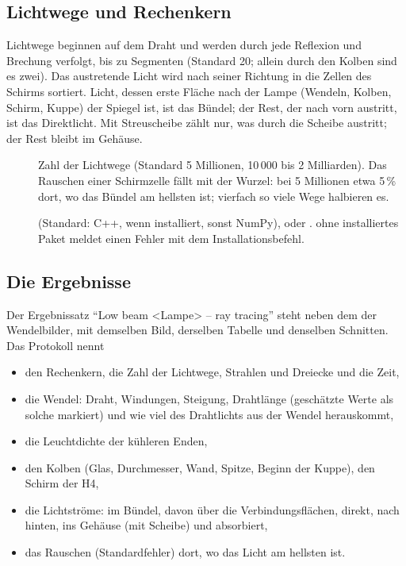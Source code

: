 \subsection{Lichtwege und Rechenkern}

Lichtwege beginnen auf dem Draht und werden durch jede Reflexion und Brechung verfolgt, bis zu
 Segmenten (Standard 20; allein durch den Kolben sind es zwei). Das austretende Licht
wird nach seiner Richtung in die Zellen des Schirms sortiert. Licht, dessen erste Fläche nach der
Lampe (Wendeln, Kolben, Schirm, Kuppe) der Spiegel ist, ist das Bündel; der Rest, der nach vorn
austritt, ist das Direktlicht. Mit Streuscheibe zählt nur, was durch die Scheibe austritt; der Rest
bleibt im Gehäuse.

\begin{description}
  \item[] Zahl der Lichtwege (Standard 5 Millionen, 10\,000 bis 2 Milliarden). Das
    Rauschen einer Schirmzelle fällt mit der Wurzel: bei 5 Millionen etwa 5\,\% dort, wo das Bündel
    am hellsten ist; vierfach so viele Wege halbieren es.
  \item[]  (Standard: C++, wenn installiert, sonst NumPy),  oder
    .  ohne installiertes Paket  meldet einen Fehler mit dem
    Installationsbefehl.
\end{description}

\subsection{Die Ergebnisse}

Der Ergebnissatz \enquote{Low beam <Lampe> – ray tracing} steht neben dem der Wendelbilder, mit
demselben Bild, derselben Tabelle und denselben Schnitten. Das Protokoll nennt
\begin{itemize}
  \item den Rechenkern, die Zahl der Lichtwege, Strahlen und Dreiecke und die Zeit,
  \item die Wendel: Draht, Windungen, Steigung, Drahtlänge (geschätzte Werte als solche markiert) und
    wie viel des Drahtlichts aus der Wendel herauskommt,
  \item die Leuchtdichte der kühleren Enden,
  \item den Kolben (Glas, Durchmesser, Wand, Spitze, Beginn der Kuppe), den Schirm der H4,
  \item die Lichtströme: im Bündel, davon über die Verbindungsflächen, direkt, nach hinten, ins
    Gehäuse (mit Scheibe) und absorbiert,
  \item das Rauschen (Standardfehler) dort, wo das Licht am hellsten ist.
\end{itemize}

